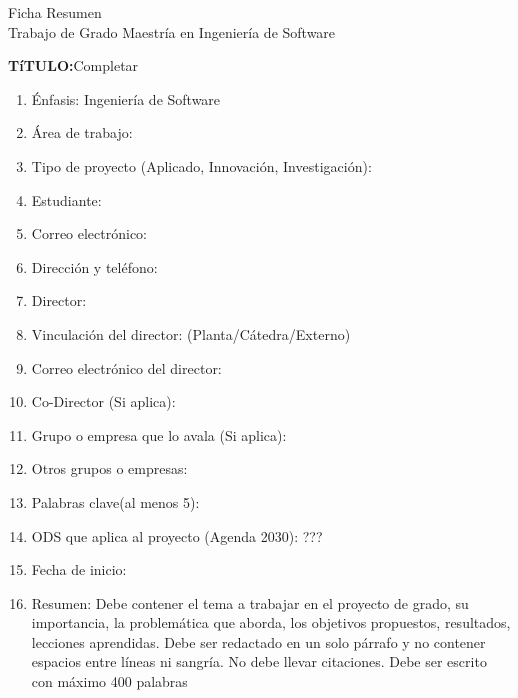 
\thispagestyle{empty}
\begin{center}
    \Large{Ficha Resumen \\ Trabajo de Grado Maestría en Ingeniería de Software}
\end{center}

\textbf{TíTULO:}{Completar}
\begin{enumerate}
    \item Énfasis: Ingeniería de Software
    \item Área de trabajo:
    \item Tipo de proyecto (Aplicado, Innovación, Investigación):
    \item Estudiante:
    \item Correo electrónico:
    \item Dirección y teléfono:
    \item Director:
    \item Vinculación del director: (Planta/Cátedra/Externo)
    \item Correo electrónico del director:
    \item Co-Director (Si aplica):
    \item Grupo o empresa que lo avala (Si aplica):
    \item Otros grupos o empresas:
    \item Palabras clave(al menos 5):
    \item ODS que aplica al proyecto (Agenda 2030): ???
    \item Fecha de inicio:
    \item Resumen:  Debe contener el tema a trabajar en el proyecto de grado, su importancia, la problemática que aborda, los objetivos propuestos, resultados, lecciones aprendidas.  Debe ser redactado en un solo párrafo y no contener espacios entre líneas ni sangría. No debe llevar citaciones.  Debe ser escrito con máximo 400 palabras 
\end{enumerate}
